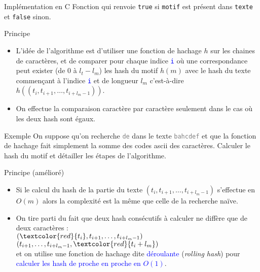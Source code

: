 \documentclass[10pt]{beamer}
\begin{document}
\begin{frame}{\Ctitle}{\stitle}
	\begin{block}{Implémentation en C}
		Fonction qui renvoie {\tt true} si {\tt motif} est présent dans {\tt texte} et {\tt false} sinon.
	\end{block}
\end{frame}

\begin{frame}{\Ctitle}{\stitle}
	\begin{block}{Principe}
		\begin{itemize}
			\item<1-> L'idée de l'algorithme est d'utiliser une fonction de hachage $h$ sur les chaines de caractères, et de comparer pour chaque indice \textcolor{blue}{\tt i} où une correspondance peut exister (de 0 à $l_t-l_m$) les hash du motif $h(m)$ avec le hash du texte commençant à l'indice \textcolor{blue}{\tt i} et de longueur $l_m$ c'est-à-dire $h((t_i,t_{i+1},\dots,t_{i+l_m-1}))$.
			\item<2-> On effectue la comparaison caractère par caractère seulement dans le cas où les deux hash sont égaux.
		\end{itemize}
	\end{block}
	{\begin{exampleblock}{Exemple}
			On suppose qu'on recherche \og{}\textcolor{gray}{\tt de}\fg{} dans le texte \og{}\textcolor{gray}{\tt bahcdef}\fg{} et que la fonction de hachage fait simplement la somme des codes {\sc ascii} des caractères. Calculer le hash du motif et détailler les étapes de l'algorithme.
		\end{exampleblock}}
\end{frame}

\begin{frame}{\Ctitle}{\stitle}
	\begin{block}{Principe (amélioré)}
		\begin{itemize}
			\item<3-> Si le calcul du hash de la partie du texte $(t_i,t_{i+1},\dots,t_{i+l_m-1})$ s'effectue en $O(m)$ alors la complexité est la même que celle de la recherche naïve.
			\item<4-> On tire parti du fait que deux hash consécutifs à calculer ne diffère que de deux caractères : \\
				$(\textcolor{red}{t_i},t_{i+1},\dots,t_{i+l_m-1})$ \\
				$(t_{i+1},\dots,t_{i+l_m-1},\textcolor{red}{t_i+l_m})$ \\
				et on utilise une fonction de hachage dite \textcolor{blue}{déroulante} (\textit{rolling hash}) pour \textcolor{blue}{calculer les hash de proche en proche en $O(1)$}.
		\end{itemize}
	\end{block}
\end{frame}
\end{document}
